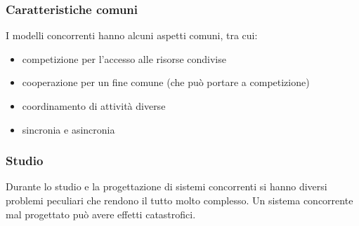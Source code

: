\documentclass[a4paper,12pt, oneside]{book}
\begin{document}
\subsubsection{Caratteristiche comuni}
I modelli concorrenti hanno alcuni aspetti comuni, tra cui:
\begin{itemize}
  \item competizione per l’accesso alle risorse condivise
  \item cooperazione per un fine comune (che può portare a competizione)
  \item coordinamento di attività diverse
  \item sincronia e asincronia
\end{itemize}
\subsubsection{Studio}
Durante lo studio e la progettazione di sistemi concorrenti si hanno diversi problemi
peculiari che rendono il tutto molto complesso. Un sistema
concorrente mal progettato può avere effetti catastrofici.  
\end{document}
